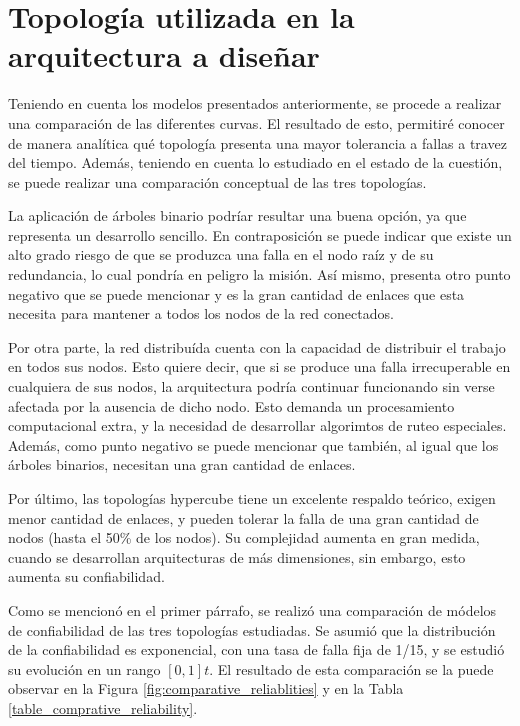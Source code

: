 \section{Topología utilizada en la arquitectura a diseñar}

Teniendo en cuenta los modelos presentados anteriormente, se procede a realizar una comparación de las diferentes curvas. El resultado de esto, permitiré conocer de manera analítica qué topología presenta una mayor tolerancia a fallas a travez del tiempo. Además, teniendo en cuenta lo estudiado en el estado de la cuestión, se puede realizar una comparación conceptual de las tres topologías.

La aplicación de árboles binario podríar resultar una buena opción, ya que representa un desarrollo sencillo. En contraposición se puede indicar que existe un alto grado riesgo de que se produzca una falla en el nodo raíz y de su redundancia, lo cual pondría en peligro la misión. Así mismo, presenta otro punto negativo que se puede mencionar y es la gran cantidad de enlaces que esta necesita para mantener a todos los nodos de la red conectados.

Por otra parte, la red distribuída cuenta con la capacidad de distribuir el trabajo en todos sus nodos. Esto quiere decir, que si se produce una falla irrecuperable en cualquiera de sus nodos, la arquitectura podría continuar funcionando sin verse afectada por la ausencia de dicho nodo. Esto demanda un procesamiento computacional extra, y la necesidad de desarrollar algorimtos de ruteo especiales. Además, como punto negativo se puede mencionar que también, al igual que los árboles binarios, necesitan una gran cantidad de enlaces.

Por último, las topologías hypercube tiene un excelente respaldo teórico, exigen menor cantidad de enlaces, y pueden tolerar la falla de una gran cantidad de nodos (hasta el 50\% de los nodos). Su complejidad aumenta en gran medida, cuando se desarrollan arquitecturas de más dimensiones, sin embargo, esto aumenta su confiabilidad.

Como se mencionó en el primer párrafo, se realizó una comparación de módelos de confiabilidad de las tres topologías estudiadas. Se asumió que la distribución de la confiabilidad es exponencial, con una tasa de falla fija de 1/15, y se estudió su evolución en un rango $[0,1]t$. El resultado de esta comparación se la puede observar en la Figura \ref{fig:comparative_reliablities} y en la Tabla \ref{table_comprative_reliability}.


